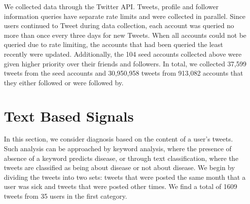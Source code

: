 \documentclass{acm_proc_article-sp}
\begin{document}
We collected data through the Twitter API. Tweets, profile and follower information queries have separate rate limits and were collected in parallel. Since users continued to Tweet during data collection, each account was queried no more than once every three days for new Tweets. When all accounts could not be queried due to rate limiting, the accounts that had been queried the least recently were updated. Additionally, the 104 seed accounts collected above were given higher priority over their friends and followers. In total, we collected 37,599 tweets from the seed accounts and 30,950,958 tweets from 913,082 accounts that they either followed or were followed by.


\section{Text Based Signals}
\label{sec:text_analysis}

In this section, we consider diagnosis based on the content of a user's tweets. Such analysis can be approached by keyword analysis, where the presence of absence of a keyword predicts disease, or through text classification, where the tweets are classified as being about disease or not about disease. We begin by dividing the tweets into two sets: tweets that were posted the same month that a user was sick and tweets that were posted other times. We find a total of 1609 tweets from 35 users in the first category.
\end{document}

